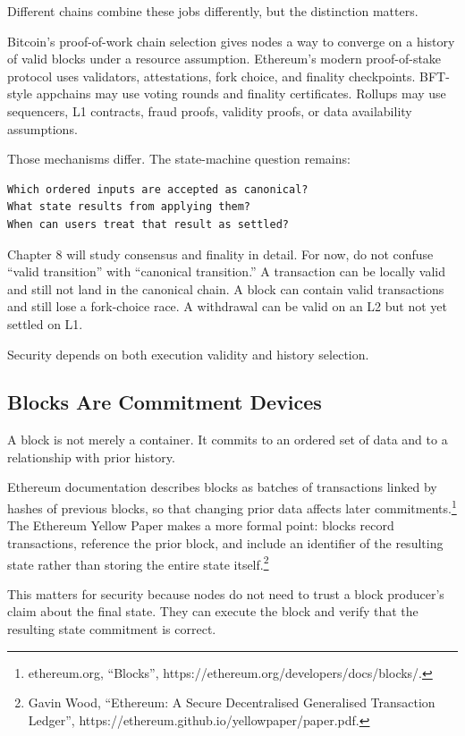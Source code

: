 Different chains combine these jobs differently, but the distinction
matters.

Bitcoin's proof-of-work chain selection gives nodes a way to converge on
a history of valid blocks under a resource assumption. Ethereum's modern
proof-of-stake protocol uses validators, attestations, fork choice, and
finality checkpoints. BFT-style appchains may use voting rounds and
finality certificates. Rollups may use sequencers, L1 contracts, fraud
proofs, validity proofs, or data availability assumptions.

Those mechanisms differ. The state-machine question remains:

\begin{lstlisting}
Which ordered inputs are accepted as canonical?
What state results from applying them?
When can users treat that result as settled?
\end{lstlisting}

Chapter 8 will study consensus and finality in detail. For now, do not
confuse ``valid transition'' with ``canonical transition.'' A
transaction can be locally valid and still not land in the canonical
chain. A block can contain valid transactions and still lose a
fork-choice race. A withdrawal can be valid on an L2 but not yet settled
on L1.

Security depends on both execution validity and history selection.

\subsection{Blocks Are Commitment Devices}

A block is not merely a container. It commits to an ordered set of data
and to a relationship with prior history.

Ethereum documentation describes blocks as batches of transactions
linked by hashes of previous blocks, so that changing prior data affects
later commitments.\footnote{ethereum.org, ``Blocks'',
  https://ethereum.org/developers/docs/blocks/.} The Ethereum Yellow
Paper makes a more formal point: blocks record transactions, reference
the prior block, and include an identifier of the resulting state rather
than storing the entire state itself.\footnote{Gavin Wood, ``Ethereum: A
  Secure Decentralised Generalised Transaction Ledger'',
  https://ethereum.github.io/yellowpaper/paper.pdf.}

This matters for security because nodes do not need to trust a block
producer's claim about the final state. They can execute the block and
verify that the resulting state commitment is correct.

